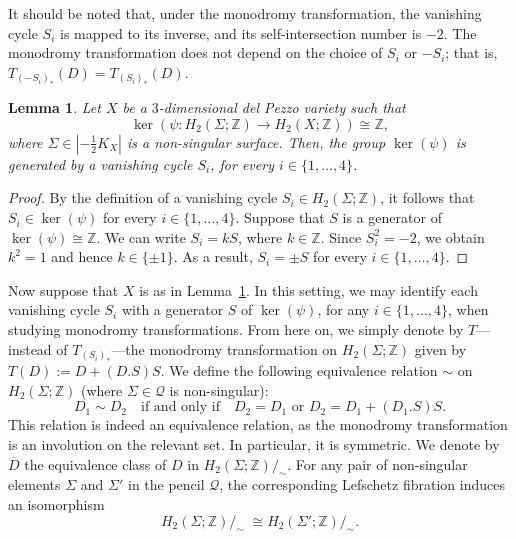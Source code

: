 \documentclass[11pt]{amsart}
\numberwithin{equation}{section}
\theoremstyle{definition}
\theoremstyle{plain}
\newtheorem{lemma}[definition]{Lemma}
\theoremstyle{remark}
\newcommand{\Z}{\mathbb{Z}}
\begin{document}
It should be noted that, under the monodromy transformation, the vanishing cycle $S_i$ is mapped to its inverse, and its self-intersection number is $-2$.  The monodromy transformation does not depend on the choice of $S_i$ or $-S_i$; that is, $T_{{(-S_i)}_*}(D)=T_{(S_i)_*}(D)$. 

\begin{lemma} \label{Lemma-Vanishing.Cycle}
  Let $X$ be a $3$-dimensional del Pezzo variety such that
  $$\ker(\psi \colon H_2(\Sigma;\mathbb{Z})\to H_2(X;\mathbb{Z}))\cong \Z,$$
where $\Sigma\in |-\frac{1}{2}K_X|$ is a non-singular surface. 
Then, the group $\ker (\psi)$ is generated by a vanishing cycle $S_i$, for every $i\in \{1,\ldots,4\}$.
\end{lemma}

\begin{proof}
By the definition of a vanishing cycle $S_i\in H_2(\Sigma;\Z)$, it follows that $S_i\in \ker (\psi)$ for every $i\in \{1,\ldots,4\}$. Suppose that $S$ is a generator of $\ker (\psi)\cong \Z$. We can write $S_i=kS$, where $k\in \Z$. Since $S_i^2=-2$, we obtain $k^2=1$ and hence $k\in \{\pm 1\}$. As a result, $S_i=\pm S$ for every $i\in \{1,\ldots,4\}$.
\end{proof}

Now suppose  that $X$ is as in Lemma~\ref{Lemma-Vanishing.Cycle}. In this setting, we may identify each vanishing cycle $S_i$ with a generator $S$ of  $\ker(\psi)$, for any $i\in \{1,\ldots,4\}$, when studying monodromy transformations. From here on, 
we simply denote by $T$---instead of $T_{(S_i)_*}$---the monodromy transformation on $H_2(\Sigma;\Z)$ given by $T(D):=D+(D.S)S$. We define the following equivalence relation $\sim$ on $H_2(\Sigma;\Z)$ (where $\Sigma \in \mathcal{Q}$ is non-singular): 
 $$D_1\sim D_2 \quad\text{if and only if}\quad  D_2=D_1 \text{ or } D_2=D_1+(D_1.S)S.$$
 This relation is indeed an equivalence relation, as the monodromy transformation is an involution on the relevant set. In particular, it is symmetric.  
 We denote by $\overline{D}$  the equivalence class of $D$ in $H_2(\Sigma;\Z)/_\sim$.  For any pair of non-singular elements  $\Sigma$ and $\Sigma'$ in the pencil $\mathcal{Q}$, the corresponding Lefschetz fibration induces an isomorphism
$$H_2(\Sigma;\Z)/_\sim \;\cong H_2(\Sigma';\Z)/_\sim .$$
\end{document}
